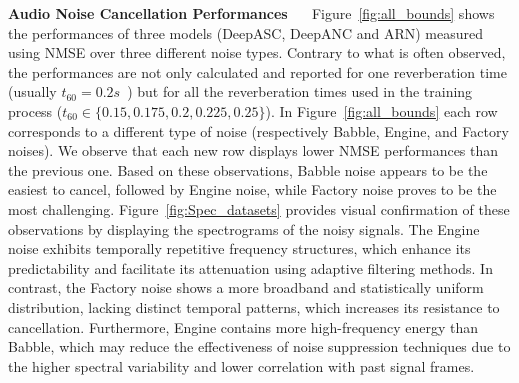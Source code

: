 \documentclass{article}
\begin{document}
\textbf{Audio Noise Cancellation Performances~~~}Figure~\ref{fig:all_bounds} shows the performances of three models (DeepASC, DeepANC and ARN) measured using NMSE over three different noise types. Contrary to what is often observed, the performances are not only calculated and reported for one reverberation time (usually $t_{60}=0.2s$~\cite{zhang2021deep, zhang2023deep, mishaly2025deepactivespeechcancellation}) but for all the reverberation times used in the training process ($t_{60} \in \{0.15, 0.175, 0.2, 0.225, 0.25\}$). In Figure~\ref{fig:all_bounds} each row corresponds to a different type of noise (respectively Babble, Engine, and Factory noises). We observe that each new row displays lower NMSE performances than the previous one. Based on these observations, Babble noise appears to be the easiest to cancel, followed by Engine noise, while Factory noise proves to be the most challenging. Figure~\ref{fig:Spec_datasets} provides visual confirmation of these observations by displaying the spectrograms of the noisy signals. The Engine noise exhibits temporally repetitive frequency structures, which enhance its predictability and facilitate its attenuation using adaptive filtering methods. In contrast, the Factory noise shows a more broadband and statistically uniform distribution, lacking distinct temporal patterns, which increases its resistance to cancellation. Furthermore, Engine contains more high-frequency energy than Babble, which may reduce the effectiveness of noise suppression techniques due to the higher spectral variability and lower correlation with past signal frames.
\end{document}
